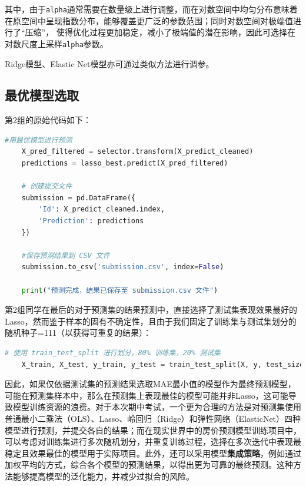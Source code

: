 \documentclass[
    report,     %
    oneside,    %
    UTF8,       %
    zihao=-4    %
]{config} %
\begin{document}
其中，由于\lstinline|alpha|通常需要在数量级上进行调整，而在对数空间中均匀分布意味着在原空间中呈现指数分布，能够覆盖更广泛的参数范围；同时对数空间对极端值进行了“压缩”， 使得优化过程更加稳定，减小了极端值的潜在影响，因此可选择在对数尺度上采样\lstinline|alpha|参数。

Ridge模型、Elastic Net模型亦可通过类似方法进行调参。

\newpage
\subsection{最优模型选取}

第2组的原始代码如下：
\begin{lstlisting}[label=code:original_code, language=Python, caption=第2组同学原始predict代码]
    #用最优模型进行预测
    X_pred_filtered = selector.transform(X_predict_cleaned) 
    predictions = lasso_best.predict(X_pred_filtered)  
    
    # 创建提交文件
    submission = pd.DataFrame({
        'Id': X_predict_cleaned.index,
        'Prediction': predictions
    })
    
    #保存预测结果到 CSV 文件
    submission.to_csv('submission.csv', index=False)
    
    print("预测完成，结果已保存至 submission.csv 文件")
\end{lstlisting}

第2组同学在最后的对于预测集的结果预测中，直接选择了测试集表现效果最好的Lasso，然而鉴于样本的固有不确定性，且由于我们固定了训练集与测试集划分的随机种子=111（以获得可重复的结果）：

\begin{lstlisting}[label=code:split, language=Python, caption=划分训练集和测试集代码]
    # 使用 train_test_split 进行划分，80% 训练集，20% 测试集
    X_train, X_test, y_train, y_test = train_test_split(X, y, test_size=0.2, random_state=111)
\end{lstlisting}

因此，如果仅依据测试集的预测结果选取MAE最小值的模型作为最终预测模型，可能在预测集样本中，那么在预测集上表现最佳的模型可能并非Lasso，这可能导致模型训练资源的浪费。对于本次期中考试，一个更为合理的方法是对预测集使用普通最小二乘法（OLS）、Lasso、岭回归（Ridge）和弹性网络（ElasticNet）四种模型进行预测，并提交各自的结果；而在现实世界中的房价预测模型训练项目中，可以考虑对训练集进行多次随机划分，并重复训练过程，选择在多次迭代中表现最稳定且效果最佳的模型用于实际项目。此外，还可以采用模型\textbf{集成策略}，例如通过加权平均的方式，综合各个模型的预测结果，以得出更为可靠的最终预测。这种方法能够提高模型的泛化能力，并减少过拟合的风险。
\end{document}
